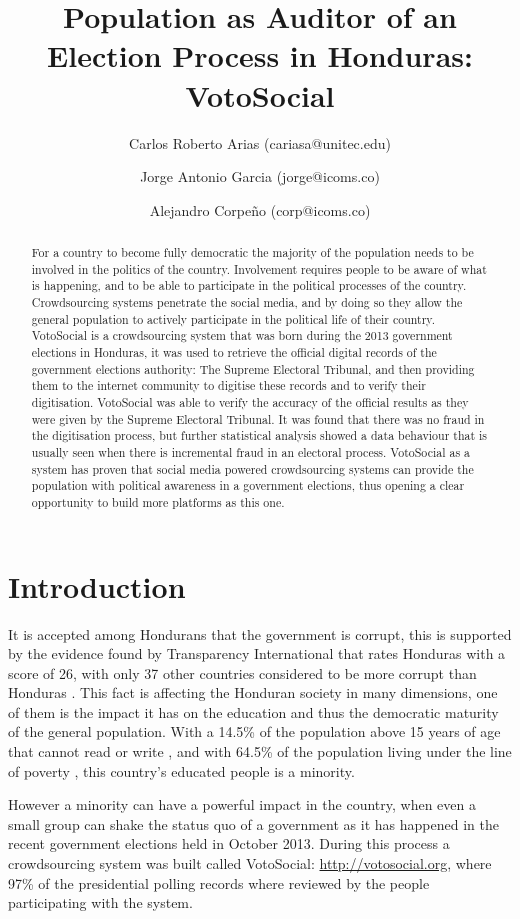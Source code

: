 \documentclass[letterpaper,10pt]{article}
\title{Population as Auditor of an Election Process in Honduras: VotoSocial}
\author[1,2]{Carlos Roberto Arias (cariasa@unitec.edu)}
\author[1,3]{Jorge Antonio Garcia (jorge@icoms.co)}
\author[3]{Alejandro Corpeño (corp@icoms.co)}
\affil[1]{Facultad de Ingenier\'{i}a, UNITEC, Tegucigalpa, Honduras}
\affil[2]{Instituto de Investigaci\'{o}n de Pol\'{i}ticas P\'{u}blicas, UNITEC, Tegucigalpa, Honduras}
\affil[3]{Icoms Technologies S de RL, Tegucigalpa, Honduras}
\begin{document}
\maketitle

\begin{abstract}
For a country to become fully democratic the majority of the population needs to be involved in the politics of the country. Involvement requires people to be aware of what is happening, and to be able to participate in the political processes of the country. Crowdsourcing systems penetrate the social media, and by doing so they allow the general population to actively participate in the political life of their country. VotoSocial is a crowdsourcing system that was born during the 2013 government elections in Honduras, it was used to retrieve the official digital records of the government elections authority: The Supreme Electoral Tribunal, and then providing them to the internet community to digitise these records and to verify their digitisation. VotoSocial was able to verify the accuracy of the official results as they were given by the Supreme Electoral Tribunal. It was found that there was no fraud in the digitisation process, but further statistical analysis showed a data behaviour that is usually seen when there is incremental fraud in an electoral process. VotoSocial as a system has proven that social media powered crowdsourcing systems can provide the population with political awareness in a government elections, thus opening a clear opportunity to build more platforms as this one.
\end{abstract}

\section{Introduction}
It is accepted among Hondurans that the government is corrupt, this is supported by the evidence found by Transparency International that rates Honduras with a score of 26, with only 37 other countries considered to be more corrupt than Honduras \citep{transp}. This fact is affecting the Honduran society in many dimensions, one of them is the impact it has on the education and thus the democratic maturity of the general population. With a 14.5\% of the population above 15 years of age that cannot read or write \citep{bchrep}, and with 64.5\% of the population living under the line of poverty \citep{wbdata}, this country's educated people is a minority.


However a minority can have a powerful impact in the country, when even a small group can shake the status quo of a government \citep{saadia2014} as it has happened in the recent government elections held in October 2013. During this process a crowdsourcing system was built called VotoSocial: \url{http://votosocial.org}, where 97\% of the presidential polling records where reviewed by the people participating with the system.
\end{document}
